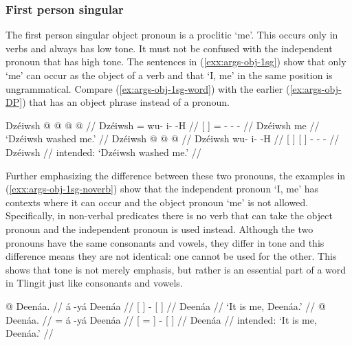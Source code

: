 \subsubsection{First person singular}\label{sec:args-obj-prons-1sg}

The first person singular object pronoun is a proclitic  ‘me’.
This occurs only in verbs and always has low tone. It must not be confused with the independent pronoun  that has high tone.
The sentences in (\ref{exx:args-obj-1sg}) show that only  ‘me’ can occur as the object of a verb and that  ‘I, me’ in the same position is ungrammatical.
Compare (\ref{ex:args-obj-1sg-word}) with the earlier (\ref{ex:args-obj-DP}) that has an object phrase instead of a pronoun.

\pex\label{exx:args-obj-1sg}%
\a\label{ex:args-obj-1sg-procl}%
%
\begingl
	\gla	{} Dzéiwsh {}  @  @ {} @ {} @ {} //
	\glb	{} Dzéiwsh {} = wu- i-  -H //
	\glc	{}[  {}] = - -  - //
	\gld	{} Dzéiwsh {} me  {} {} {} //
	\glft	‘Dzéiwsh washed me.’
		//
\endgl
\a\label{ex:args-obj-1sg-word}%
\ljudge{*}%
%
\begingl
	\gla	{} Dzéiwsh {} {}  {}  @ {} @ {} @ {} //
	\glb	{} Dzéiwsh {} {}  {} wu- i-  -H //
	\glc	{}[  {}] {}[  {}] - -  - //
	\gld	{} Dzéiwsh {} {}  {}  {} {} {} //
	\glft	intended: ‘Dzéiwsh washed me.’
		//
\endgl
\xe

Further emphasizing the difference between these two pronouns, the examples in (\ref{exx:args-obj-1sg-noverb}) show that the independent pronoun  ‘I, me’ has contexts where it can occur and the object pronoun  ‘me’ is not allowed.
Specifically, in non-verbal predicates there is no verb that can take the object pronoun  and the independent pronoun  is used instead.
Although the two pronouns have the same consonants and vowels, they differ in tone and this difference means they are not identical: one cannot be used for the other.
This shows that tone is not merely emphasis, but rather is an essential part of a word in Tlingit just like consonants and vowels.

\pex\label{exx:args-obj-1sg-noverb}%
\a\label{ex:args-obj-1sg-noverb-indep}%
%
\begingl
	\gla	{}  {}  @ {} {} Deenáa. {} //
	\glb	{}  {} á -yá {} Deenáa {}  //
	\glc	{}[  {}]  - {}[  {}] //
	\gld	{}  {}  {} {} Deenáa {} //
	\glft	‘It is me, Deenáa.’
		//
\endgl
\a\label{ex:args-obj-1sg-noverb-procl}%
\ljudge{*}%
%
\begingl
	\gla	{}  {}  @ {} {} Deenáa. {} //
	\glb	{} = {} á -yá {} Deenáa {}  //
	\glc	{}[ = {}]  - {}[  {}] //
	\gld	{}  {}  {} {} Deenáa {} //
	\glft	intended: ‘It is me, Deenáa.’
		//
\endgl
\xe

